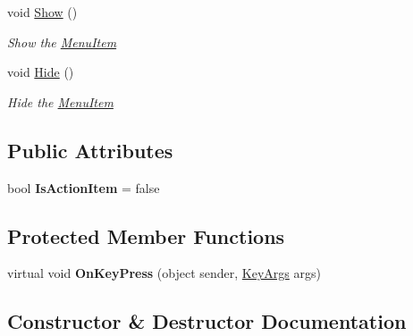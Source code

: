 \begin{DoxyCompactItemize}
void \mbox{\hyperlink{class_space_v_i_l_1_1_menu_item_a6580890d0efc3f2a6f075d7a4ac71b1d}{Show}} ()
\begin{DoxyCompactList}\small\item\em Show the \mbox{\hyperlink{class_space_v_i_l_1_1_menu_item}{Menu\+Item}} \end{DoxyCompactList}\item 
void \mbox{\hyperlink{class_space_v_i_l_1_1_menu_item_ae2e42e8ae16b40a8386bbbdb53ccb059}{Hide}} ()
\begin{DoxyCompactList}\small\item\em Hide the \mbox{\hyperlink{class_space_v_i_l_1_1_menu_item}{Menu\+Item}} \end{DoxyCompactList}\end{DoxyCompactItemize}
\subsection*{Public Attributes}
\begin{DoxyCompactItemize}
\item 
\mbox{\label{class_space_v_i_l_1_1_menu_item_a8406c78ff330bd74c51573d208fafbb8}} 
bool {\bfseries Is\+Action\+Item} = false
\end{DoxyCompactItemize}
\subsection*{Protected Member Functions}
\begin{DoxyCompactItemize}
\item 
\mbox{\label{class_space_v_i_l_1_1_menu_item_afcdc082278d0031afdde49c27434ed40}} 
virtual void {\bfseries On\+Key\+Press} (object sender, \mbox{\hyperlink{class_space_v_i_l_1_1_core_1_1_key_args}{Key\+Args}} args)
\end{DoxyCompactItemize}


\subsection{Constructor \& Destructor Documentation}
\mbox{\label{class_space_v_i_l_1_1_menu_item_ac63df35b47cb47c446208e9024d070c8}} 
